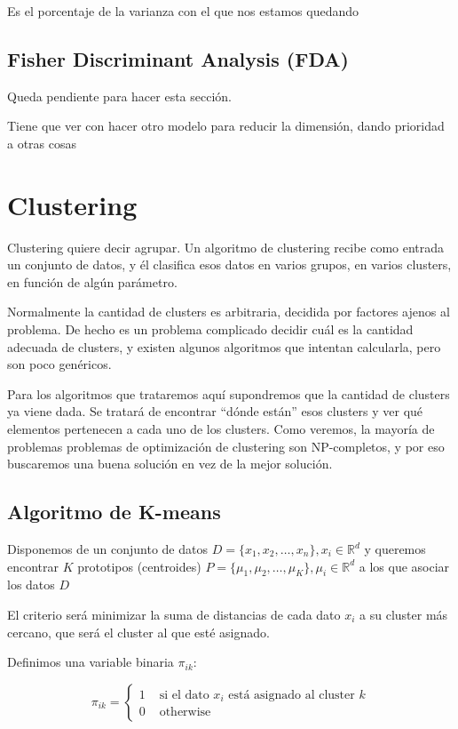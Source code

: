 \documentclass[a4paper,10pt]{article}
\begin{document}
Es el porcentaje de la varianza con el que nos estamos quedando

\subsection{Fisher Discriminant Analysis (FDA)}
Queda pendiente para hacer esta sección.

Tiene que ver con hacer otro modelo para reducir la dimensión, dando prioridad a otras cosas

\section{Clustering}
Clustering quiere decir agrupar. Un algoritmo de clustering recibe como entrada un conjunto de datos, y él clasifica esos datos en varios grupos, en varios clusters, en función de algún parámetro.

Normalmente la cantidad de clusters es arbitraria, decidida por factores ajenos al problema. De hecho es un problema complicado decidir cuál es la cantidad adecuada de clusters, y existen algunos algoritmos que intentan calcularla, pero son poco genéricos.

Para los algoritmos que trataremos aquí supondremos que la cantidad de clusters ya viene dada. Se tratará de encontrar ``dónde están'' esos clusters y ver qué elementos pertenecen a cada uno de los clusters. Como veremos, la mayoría de problemas problemas de optimización de clustering son NP-completos, y por eso buscaremos una buena solución en vez de la mejor solución.

\subsection{Algoritmo de K-means}
Disponemos de un conjunto de datos $D = \{x_1, x_2, \dots, x_n\}, x_i \in \mathbb{R}^d$ y queremos encontrar $K$ prototipos (centroides) $P = \{\mu_1, \mu_2, \dots, \mu_K\}, \mu_i \in \mathbb{R}^d$ a los que asociar los datos $D$

El criterio será minimizar la suma de distancias de cada dato $x_i$ a su cluster más cercano, que será el cluster al que esté asignado.

Definimos una variable binaria $\pi_{ik}$:

\begin{equation*}
\pi_{ik} = 
\begin{cases}
1 & \text{ si el dato $x_i$ está asignado al cluster $k$} \\
0  & \text{ otherwise}
\end{cases}
\end{equation*}
\end{document}
